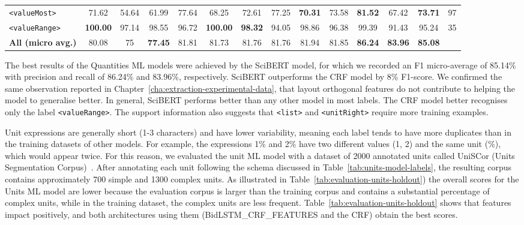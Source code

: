 \begin{table}[htbp]
{\begin{tabular}{l ccc ccc ccc ccc r}
        \texttt{<valueMost>} & 71.62 & 54.64 & 61.99 & 77.64 & 68.25 & 72.61 & 77.25 & \textbf{70.31} & 73.58 & \textbf{81.52} & 67.42 & \textbf{73.71} & 97\\
        \texttt{<valueRange>} & \textbf{100.00} & 97.14 & 98.55 & 96.72 & \textbf{100.00} & \textbf{98.32} & 94.05 & 98.86 & 96.38 & 99.39 & 91.43 & 95.24 & 35\\
        \midrule
        \textbf{All (micro avg.)} & 80.08 & 75 & \textbf{77.45} & 81.81 & 81.73 & 81.76 & 81.76 & 81.94 & 81.85 & \textbf{86.24} & \textbf{83.96} & \textbf{85.08} & \\
        \bottomrule
    \end{tabular}
    }
    
    \label{tab:evaluation-quantities-holdout}
\end{table}


The best results of the Quantities ML models were achieved by the SciBERT model, for which we recorded an F1 micro-average of 85.14\% with precision and recall of 86.24\% and 83.96\%, respectively. SciBERT outperforms the CRF model by 8\% F1-score.  
We confirmed the same observation reported in Chapter~\ref{cha:extraction-experimental-data}, that layout orthogonal features do not contribute to helping the model to generalise better. 
In general, SciBERT performs better than any other model in most labels. The CRF model better recognises only the label \texttt{<valueRange>}. 
The support information also suggests that \texttt{<list>} and \texttt{<unitRight>} require more training examples.

Unit expressions are generally short (1-3 characters) and have lower variability, meaning each label tends to have more duplicates than in the training datasets of other models. 
For example, the expressions 1\% and 2\% have two different values (1, 2) and the same unit (\%), which would appear twice. 
For this reason, we evaluated the unit ML model with a dataset of 2000 annotated units called UniSCor (Units Segmentation Corpus)~\cite{foppiano2019leveraging}.
After annotating each unit following the schema discussed in Table~\ref{tab:units-model-labels}, the resulting corpus contains approximately 700 simple and 1300 complex units. 
As illustrated in Table~\ref{tab:evaluation-units-holdout}) the overall scores for the Units ML model are lower because the evaluation corpus is larger than the training corpus and contains a substantial percentage of complex units, while in the training dataset, the complex units are less frequent.  
Table~\ref{tab:evaluation-units-holdout} shows that features impact positively, and both architectures using them (BidLSTM\_CRF\_FEATURES and the CRF) obtain the best scores. 


